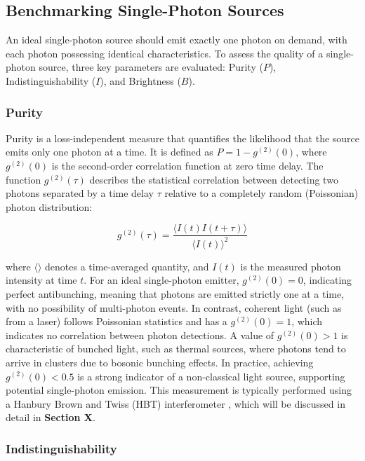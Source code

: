 \subsection{Benchmarking Single-Photon Sources}

An ideal single-photon source should emit exactly one photon on demand, with each photon possessing identical characteristics. To assess the quality of a single-photon source, three key parameters are evaluated: Purity ($P$), Indistinguishability ($I$), and Brightness ($B$). 

\subsubsection{Purity}
Purity is a loss-independent measure that quantifies the likelihood that the source emits only one photon at a time. It is defined as $P = 1 - g^{(2)}(0)$, where $g^{(2)}(0)$ is the second-order correlation function at zero time delay. The function $g^{(2)}(\tau)$ describes the statistical correlation between detecting two photons separated by a time delay $\tau$ relative to a completely random (Poissonian) photon distribution:

\begin{equation}
    g^{(2)}(\tau) = \frac{\langle I(t)I(t+\tau)\rangle}{\langle I(t)\rangle^2}
\end{equation}

where $\langle \rangle$ denotes a time-averaged quantity, and $I(t)$ is the measured photon intensity at time $t$. For an ideal single-photon emitter, $g^{(2)}(0) = 0$, indicating perfect antibunching, meaning that photons are emitted strictly one at a time, with no possibility of multi-photon events. In contrast, coherent light (such as from a laser) follows Poissonian statistics and has a $g^{(2)}(0) = 1$, which indicates no correlation between photon detections. A value of $g^{(2)}(0) > 1$ is characteristic of bunched light, such as thermal sources, where photons tend to arrive in clusters due to bosonic bunching effects. In practice, achieving $g^{(2)}(0) < 0.5$ is a strong indicator of a non-classical light source, supporting potential single-photon emission. This measurement is typically performed using a Hanbury Brown and Twiss (HBT) interferometer \cite{Brown1956}, which will be discussed in detail in \textbf{Section X}. 

\subsubsection{Indistinguishability}

